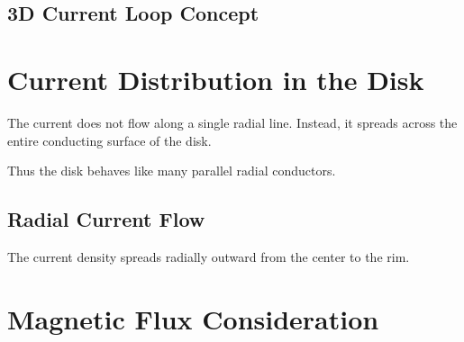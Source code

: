 \documentclass[12pt, a4paper]{article}
\begin{document}
\subsection{3D Current Loop Concept}

\begin{center}
\end{center}

\section{Current Distribution in the Disk}

The current does not flow along a single radial line. 
Instead, it spreads across the entire conducting surface of the disk.

Thus the disk behaves like many parallel radial conductors.

\subsection{Radial Current Flow}

\begin{center}
\end{center}

The current density spreads radially outward from the center to the rim.

\section{Magnetic Flux Consideration}
\end{document}
